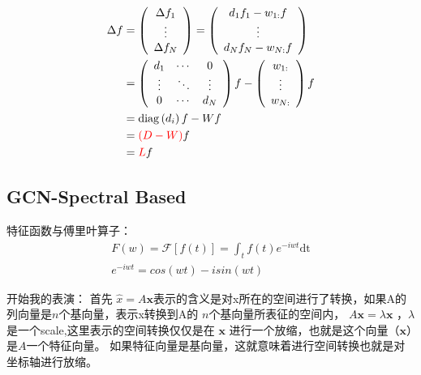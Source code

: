     \begin{align*}
        \Delta f & =    \left(\begin{array}{c}
            \Delta f_{1} \\
            \vdots \\
            \Delta f_{N}
            \end{array}\right)=\left(\begin{array}{c}
            d_{1} f_{1}-w_{1:} f \\
            \vdots \\
            d_{N} f_{N}-w_{N:} f
            \end{array}\right)  \\
            & =  \left(\begin{array}{ccc}
                d_{1} & \cdots & 0 \\
                \vdots & \ddots & \vdots \\
                0 & \cdots & d_{N}
                \end{array}\right) f-\left(\begin{array}{c}
                w_{1:} \\
                \vdots \\
                w_{N:}
                \end{array}\right) f \\
            & =\operatorname{diag}\left(d_{i}\right) f-W f \\
            & ={\color{myred} (D-W)}f \\
            &={\color{myred} L } f
    \end{align*}


  \subsection{GCN-Spectral Based}       

 
    特征函数与傅里叶算子：
    \begin{align}
        F(w) = \mathcal{F}\left [ f(t) \right ] = \int_{ t } f(t)e^{-iwt}\mathrm{ dt } \\
        e^{-iwt} = cos(wt) - isin(wt) 
    \end{align}
 
    开始我的表演：
    首先 $ \hat{x} = A \boldsymbol x $表示的含义是对x所在的空间进行了转换，如果A的列向量是$ n $个基向量，表示x转换到A的 $ n $个基向量所表征的空间内， $ A \boldsymbol x  = \lambda \boldsymbol x $ ，$ \lambda $是一个scale,这里表示的空间转换仅仅是在
     $ \boldsymbol x $ 进行一个放缩，也就是这个向量（$ \boldsymbol x $）是$ A $一个特征向量。
    如果特征向量是基向量，这就意味着进行空间转换也就是对坐标轴进行放缩。

